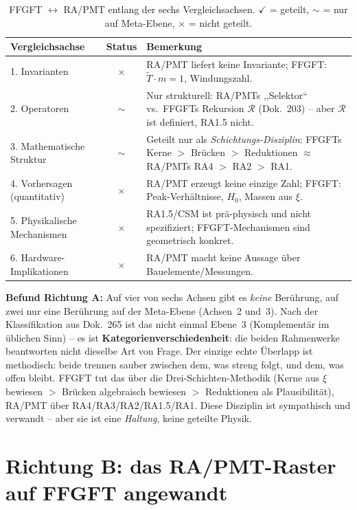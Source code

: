 \begin{table}[htbp]
\centering
\caption{FFGFT $\leftrightarrow$ RA/PMT entlang der sechs Vergleichsachsen.
$\checkmark$ = geteilt, $\sim$ = nur auf Meta-Ebene, $\times$ = nicht geteilt.}
\label{tab:richtungA}
\begin{tabular}{p{6.5cm}c p{4cm}}
\toprule
\textbf{Vergleichsachse} & \textbf{Status} & \textbf{Bemerkung} \\
\midrule
1. Invarianten          & $\times$ &
  RA/PMT liefert keine Invariante; FFGFT: $\tilde{T}\cdot m=1$, Windungszahl. \\
2. Operatoren           & $\sim$ &
  Nur strukturell: RA/PMTs ,,Selektor`` vs.\ FFGFTs Rekursion $\mathcal{R}$
  (Dok.~203) -- aber $\mathcal{R}$ ist definiert, RA1.5 nicht. \\
3. Mathematische Struktur & $\sim$ &
  Geteilt nur als \emph{Schichtungs-Disziplin}: FFGFTs Kerne $>$ Brücken
  $>$ Reduktionen $\approx$ RA/PMTs RA4 $>$ RA2 $>$ RA1. \\
4. Vorhersagen (quantitativ) & $\times$ &
  RA/PMT erzeugt keine einzige Zahl; FFGFT: Peak-Verhältnisse, $H_0$,
  Massen aus $\xi$. \\
5. Physikalische Mechanismen & $\times$ &
  RA1.5/CSM ist prä-physisch und nicht spezifiziert; FFGFT-Mechanismen
  sind geometrisch konkret. \\
6. Hardware-Implikationen & $\times$ &
  RA/PMT macht keine Aussage über Bauelemente/Messungen. \\
\bottomrule
\end{tabular}
\end{table}

\textbf{Befund Richtung A:} Auf vier von sechs Achsen gibt es
\emph{keine} Berührung, auf zwei nur eine Berührung auf der Meta-Ebene
(Achsen~2 und~3). Nach der Klassifikation aus Dok.~265 ist das nicht
einmal Ebene~3 (Komplementär im üblichen Sinn) -- es ist
\textbf{Kategorienverschiedenheit}: die beiden Rahmenwerke beantworten
nicht dieselbe Art von Frage. Der einzige echte Überlapp ist
methodisch: beide trennen sauber zwischen dem, was streng folgt, und
dem, was offen bleibt. FFGFT tut das über die Drei-Schichten-Methodik
(Kerne aus $\xi$ bewiesen $>$ Brücken algebraisch bewiesen $>$
Reduktionen als Plausibilität), RA/PMT über RA4/RA3/RA2/RA1.5/RA1.
Diese Disziplin ist sympathisch und verwandt -- aber sie ist eine
\emph{Haltung}, keine geteilte Physik.

\section{Richtung B: das RA/PMT-Raster auf FFGFT angewandt}

